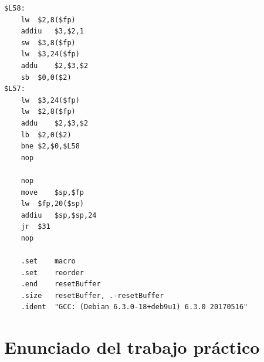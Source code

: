 \documentclass[titlepage,a4paper]{article}
\begin{document}
\begin{lstlisting}[style=custom_mips]
$L58:
	lw	$2,8($fp)
	addiu	$3,$2,1
	sw	$3,8($fp)
	lw	$3,24($fp)
	addu	$2,$3,$2
	sb	$0,0($2)
$L57:
	lw	$3,24($fp)
	lw	$2,8($fp)
	addu	$2,$3,$2
	lb	$2,0($2)
	bne	$2,$0,$L58
	nop

	nop
	move	$sp,$fp
	lw	$fp,20($sp)
	addiu	$sp,$sp,24
	jr	$31
	nop

	.set	macro
	.set	reorder
	.end	resetBuffer
	.size	resetBuffer, .-resetBuffer
	.ident	"GCC: (Debian 6.3.0-18+deb9u1) 6.3.0 20170516"
\end{lstlisting}

\section{Enunciado del trabajo práctico}
% 

\newpage
\end{document}
